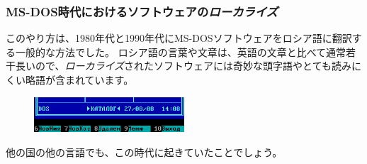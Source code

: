 \subsubsection{MS-DOS時代におけるソフトウェアの\emph{ローカライズ}}

このやり方は、1980年代と1990年代にMS-DOSソフトウェアをロシア語に翻訳する一般的な方法でした。 ロシア語の言葉や文章は、英語の文章と比べて通常若干長いので、\emph{ローカライズ}されたソフトウェアには奇妙な頭字語やとても読みにくい略語が含まれています。

\begin{figure}[H]
\centering
\includegraphics[width=0.5\textwidth]{patterns/01_helloworld/Norton_Commander_v5_51.png}
\caption{\JPph{}}
\end{figure}

他の国の他の言語でも、この時代に起きていたことでしょう。
